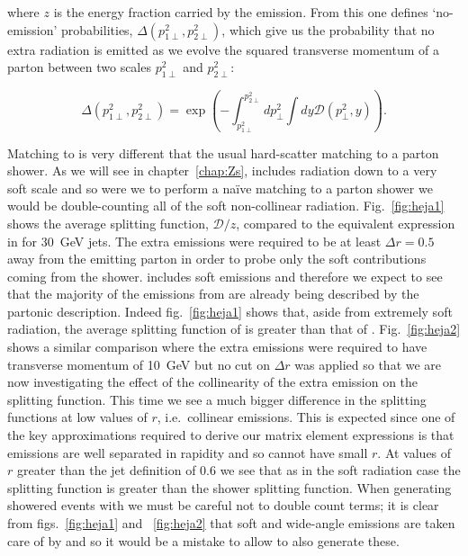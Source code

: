 		where $z$ is the energy fraction carried by the emission.  From this one defines `no-emission'
		probabilities, $\Delta(p_{1\perp}^2, p_{2\perp}^2)$, which
		give us the probability that no extra radiation is emitted as we evolve the squared transverse
		momentum of a parton between two scales $p_{1\perp}^2$ and $p_{2\perp}^2$:

		\begin{equation}
			\Delta(p_{1\perp}^2, p_{2\perp}^2) = \exp\left(-\int_{p_{1\perp}^2}^{p_{2\perp}^2}dp_{\perp}^2
			\int dy\mathcal{D}(p_\perp^2, y)\right).
		\end{equation}

		Matching \HEJ to \ARIADNE is very different that the usual hard-scatter matching to a parton shower. As we
		will see in chapter~\ref{chap:Zs}, \HEJ includes radiation down to a very soft scale and so were we to perform
		a na\"ive matching to a parton shower we would be double-counting all of the soft non-collinear radiation.
		Fig.~\eqref{fig:heja1} shows the average \ARIADNE splitting function, $\mathcal{D}/z$, compared to
		the equivalent expression in \HEJ for 30~GeV jets.  The extra emissions were required to be at least
		$\Delta r=0.5$ away from the emitting parton in order to probe only the soft contributions coming from
		the shower.  \HEJ includes soft emissions and therefore we expect to see that the majority of
		the emissions from \ARIADNE are already being described by the partonic description.  Indeed fig.~\eqref{fig:heja1}
		shows that, aside from extremely soft radiation, the average splitting function of \HEJ is greater than that of
		\ARIADNE. Fig.~\eqref{fig:heja2} shows a similar comparison where the extra emissions were required to have
		transverse momentum of 10~GeV but no cut on $\Delta r$ was applied so that we are now investigating the effect of
		the collinearity of the extra emission on the splitting function.  This time we see a much bigger difference in
		the splitting functions at low values of $r$, i.e.~collinear emissions.  This is expected since one of the key
		approximations required to derive our matrix element expressions is that emissions are well separated in rapidity
		and so cannot have small $r$.  At values of $r$ greater than the jet definition of 0.6 we see that as in the soft
		radiation case the \HEJ splitting function is greater than the shower splitting function.  When generating showered
		events with \HEJA we must be careful not to double count terms; it is clear from figs.~\eqref{fig:heja1} and
		~\eqref{fig:heja2} that soft and wide-angle emissions are taken care of by \HEJ and so it would be a mistake
		to allow \ARIADNE to also generate these.

